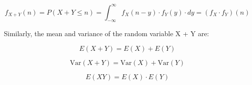 \documentclass[12pt]{report}
\renewcommand{\_}{\kern-1.5pt\textunderscore\kern-1.5pt}
\begin{document}
 \[ f_{X+Y} \left( n \right) =P \left( X+Y \leq n \right) = \int _{-\infty}^{\infty}f_{X} \left( n-y \right)  \cdot f_{Y} \left( y \right)  \cdot dy= \left( f_{X} \cdot f_{Y} \right)  \left( n \right)  \] \par

\begin{adjustwidth}{1.0in}{0.0in}
Similarly, the mean and variance of the random variable X + Y are:\par

\end{adjustwidth}

\begin{adjustwidth}{1.0in}{0.0in}
 \[ E \left( X+Y \right) =E \left( X \right) +E \left( Y \right)  \] \par

\end{adjustwidth}

\begin{adjustwidth}{1.0in}{0.0in}
 \[ \mathrm{Var} \left( X+Y \right) =\mathrm{Var} \left( X \right) +\mathrm{Var} \left( Y \right)  \] \par

\end{adjustwidth}

\begin{adjustwidth}{1.0in}{0.0in}
 \[ E \left( XY \right) =E \left( X \right)  \cdot E \left( Y \right)  \] \par

\end{adjustwidth}
\end{document}

